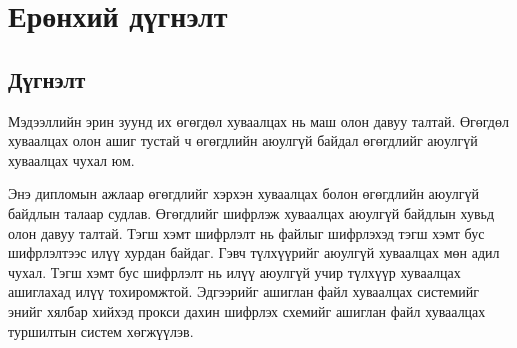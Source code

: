 \chapter{Ерөнхий дүгнэлт}

\pagecolor{white}

\section*{\centering \huge{Дүгнэлт}}
Мэдээллийн эрин зуунд их өгөгдөл хуваалцах нь маш олон давуу талтай. Өгөгдөл хуваалцах олон ашиг тустай ч өгөгдлийн аюулгүй байдал өгөгдлийг аюулгүй хуваалцах чухал юм. 

Энэ дипломын ажлаар өгөгдлийг хэрхэн хуваалцах болон өгөгдлийн аюулгүй байдлын талаар судлав. Өгөгдлийг шифрлэж хуваалцах аюулгүй байдлын хувьд олон давуу талтай. 
Тэгш хэмт шифрлэлт нь файлыг шифрлэхэд тэгш хэмт бус шифрлэлтээс илүү хурдан байдаг. Гэвч түлхүүрийг аюулгүй хуваалцах мөн адил чухал. Тэгш хэмт бус шифрлэлт нь илүү аюулгүй учир түлхүүр хуваалцах ашиглахад илүү тохиромжтой. 
Эдгээрийг ашиглан файл хуваалцах системийг энийг хялбар хийхэд прокси дахин шифрлэх схемийг ашиглан файл хуваалцах туршилтын систем хөгжүүлэв.

